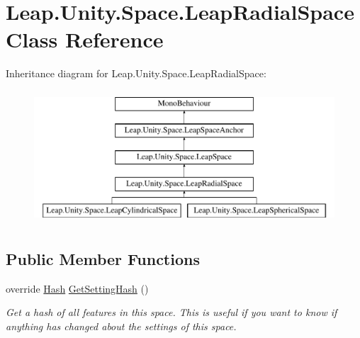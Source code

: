 \hypertarget{class_leap_1_1_unity_1_1_space_1_1_leap_radial_space}{}\section{Leap.\+Unity.\+Space.\+Leap\+Radial\+Space Class Reference}
\label{class_leap_1_1_unity_1_1_space_1_1_leap_radial_space}
Inheritance diagram for Leap.\+Unity.\+Space.\+Leap\+Radial\+Space\+:\begin{figure}[H]
\begin{center}
\leavevmode
\includegraphics[height=5.000000cm]{class_leap_1_1_unity_1_1_space_1_1_leap_radial_space}
\end{center}
\end{figure}
\subsection*{Public Member Functions}
\begin{DoxyCompactItemize}
\item 
override \mbox{\hyperlink{struct_leap_1_1_unity_1_1_hash}{Hash}} \mbox{\hyperlink{class_leap_1_1_unity_1_1_space_1_1_leap_radial_space_a65716a3a40c5dc3bcf957b05f878960c}{Get\+Setting\+Hash}} ()
\begin{DoxyCompactList}\small\item\em Get a hash of all features in this space. This is useful if you want to know if anything has changed about the settings of this space. \end{DoxyCompactList}\end{DoxyCompactItemize}
